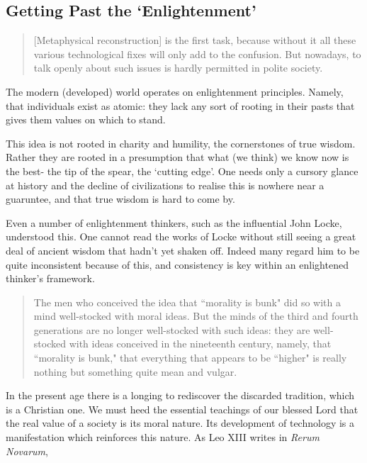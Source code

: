 \documentclass[letterpaper]{article}
\begin{document}
\subsection{Getting Past the `Enlightenment'}

\begin{quote}
  [Metaphysical reconstruction] is the first task, because without it all these various technological fixes will only add to the confusion. But nowadays, to talk openly about such issues is hardly permitted in polite society.
\end{quote}

The modern (developed) world operates on enlightenment principles. Namely, that individuals exist as atomic: they lack any sort of rooting in their pasts that gives them values on which to stand.

This idea is not rooted in charity and humility, the cornerstones of true wisdom. Rather they are rooted in a presumption that what (we think) we know now is the best- the tip of the spear, the `cutting edge'. One needs only a cursory glance at history and the decline of civilizations to realise this is nowhere near a guaruntee, and that true wisdom is hard to come by.

Even a number of enlightenment thinkers, such as the influential John Locke, understood this. One cannot read the works of Locke without still seeing a great deal of ancient wisdom that hadn't yet shaken off. Indeed many regard him to be quite inconsistent because of this, and consistency is key within an enlightened thinker's framework.

\begin{quote}
  The men who conceived the idea that ``morality is bunk" did so with a mind well-stocked with moral ideas. But the minds of the third and fourth generations are no longer well-stocked with such ideas: they are well-stocked with ideas conceived in the nineteenth century, namely, that ``morality is bunk," that everything that appears to be ``higher" is really nothing but something quite mean and vulgar.
\end{quote}

In the present age there is a longing to rediscover the discarded tradition, which is a Christian one. We must heed the essential teachings of our blessed Lord that the real value of a society is its moral nature. Its development of technology is a manifestation which reinforces this nature. As Leo XIII writes in \textit{Rerum Novarum},
\end{document}
